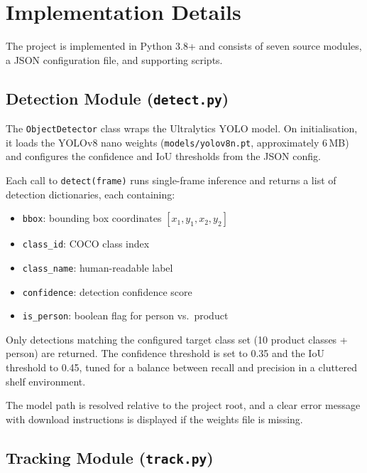\documentclass[12pt,a4paper]{article}
\begin{document}
\section{Implementation Details}

The project is implemented in Python 3.8+ and consists of seven source modules, a JSON configuration file, and supporting scripts.

\subsection{Detection Module (\texttt{detect.py})}

The \texttt{ObjectDetector} class wraps the Ultralytics YOLO model.
On initialisation, it loads the YOLOv8 nano weights (\texttt{models/yolov8n.pt}, approximately 6\,MB) and configures the confidence and IoU thresholds from the JSON config.

Each call to \texttt{detect(frame)} runs single-frame inference and returns a list of detection dictionaries, each containing:
\begin{itemize}[nosep]
    \item \texttt{bbox}: bounding box coordinates $[x_1, y_1, x_2, y_2]$
    \item \texttt{class\_id}: COCO class index
    \item \texttt{class\_name}: human-readable label
    \item \texttt{confidence}: detection confidence score
    \item \texttt{is\_person}: boolean flag for person vs.\ product
\end{itemize}

Only detections matching the configured target class set (10 product classes + person) are returned.
The confidence threshold is set to 0.35 and the IoU threshold to 0.45, tuned for a balance between recall and precision in a cluttered shelf environment.

The model path is resolved relative to the project root, and a clear error message with download instructions is displayed if the weights file is missing.

\subsection{Tracking Module (\texttt{track.py})}
\end{document}
